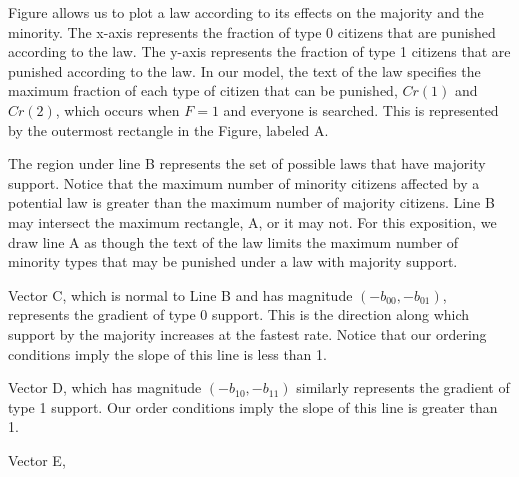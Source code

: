 Figure  allows us to plot a law according to its effects on the majority and the minority.  The x-axis represents the fraction of type 0 citizens that are punished according to the law.  The y-axis represents the fraction of type 1 citizens that are punished according to the law.  In our model, the text of the law specifies the maximum fraction of each type of citizen that can be punished, $Cr(1)$ and $Cr(2)$, which occurs when $F=1$ and everyone is searched.  This is represented by the outermost rectangle in the Figure, labeled A.

The region under line B represents the set of possible laws that have majority support.  Notice that the maximum number of minority citizens affected by a potential law is greater than the maximum number of majority citizens.  Line B may intersect the maximum rectangle, A, or it may not.  For this exposition, we draw line A as though the text of the law limits the maximum number of minority types that may be punished under a law with majority support.

Vector C, which is normal to Line B and has magnitude $(-b_{00}, -b_{01})$, represents the gradient of type 0 support.  This is the direction along which support by the majority increases at the fastest rate.  Notice that our ordering conditions imply the slope of this line is less than 1.

Vector D, which has magnitude $(-b_{10}, -b_{11})$ similarly represents the gradient of type 1 support.  Our order conditions imply the slope of this line is greater than 1.

Vector E, 



